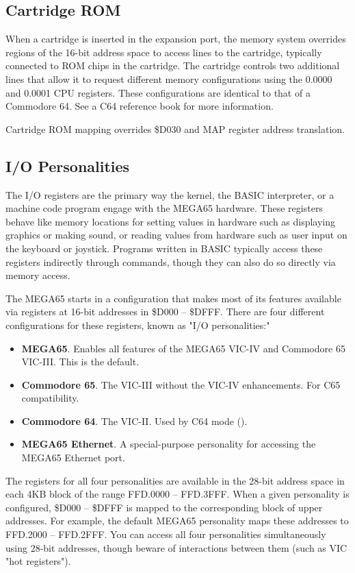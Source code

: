 \subsection{Cartridge ROM}

When a cartridge is inserted in the expansion port, the memory system overrides
regions of the 16-bit address space to access lines to the cartridge, typically
connected to ROM chips in the cartridge. The cartridge controls two additional
lines that allow it to request different memory configurations using the 0.0000
and 0.0001 CPU registers. These configurations are identical to that of a
Commodore 64. See a C64 reference book for more information.

Cartridge ROM mapping overrides \$D030 and MAP register address translation.

\subsection{I/O Personalities}

The I/O registers are the primary way the kernel, the BASIC interpreter, or a
machine code program engage with the MEGA65 hardware. These registers behave
like memory locations for setting values in hardware such as displaying
graphics or making sound, or reading values from hardware such as user input on
the keyboard or joystick. Programs written in BASIC typically access these
registers indirectly through commands, though they can also do so directly via
memory access.

The MEGA65 starts in a configuration that makes most of its features available
via registers at 16-bit addresses in \$D000 -- \$DFFF. There are four different
configurations for these registers, known as "I/O personalities:"

\begin{itemize}
\item {\bf MEGA65}. Enables all features of the MEGA65 VIC-IV and Commodore 65
VIC-III. This is the default.
\item {\bf Commodore 65}. The VIC-III without the VIC-IV enhancements. For C65 compatibility.
\item {\bf Commodore 64}. The VIC-II. Used by C64 mode ().
\item {\bf MEGA65 Ethernet}. A special-purpose personality for accessing the
MEGA65 Ethernet port.
\end{itemize}

The registers for all four personalities are available in the 28-bit address
space in each 4KB block of the range FFD.0000 -- FFD.3FFF. When a given
personality is configured, \$D000 -- \$DFFF is mapped to the corresponding
block of upper addresses. For example, the default MEGA65 personality maps
these addresses to FFD.2000 -- FFD.2FFF. You can access all four personalities
simultaneously using 28-bit addresses, though beware of interactions between
them (such as VIC "hot registers").

